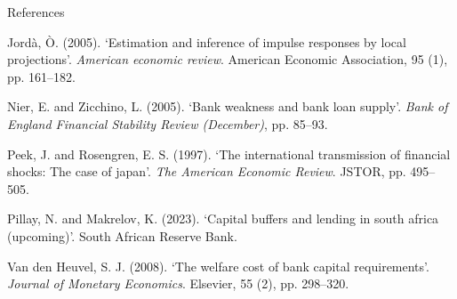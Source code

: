 \documentclass[
  14,
  ignorenonframetext,
  aspectratio=141,
]{beamer}
\newlength{\cslhangindent}
\newlength{\cslentryspacingunit} %
\newenvironment{CSLReferences}[2] %
 {%
  \setlength{\parindent}{0pt}
  \ifodd #1
  \let\oldpar\par
  \def\par{\hangindent=\cslhangindent\oldpar}
  \fi
  \setlength{\parskip}{#2\cslentryspacingunit}
 }%
 {}
\begin{document}
\begin{frame}[allowframebreaks]{References}
\begin{CSLReferences}{0}{0}
\leavevmode{}%
Jordà, Ò. (2005). {`Estimation and inference of impulse responses by
local projections'}. \emph{American economic review}. American Economic
Association, 95 (1), pp. 161--182.

\leavevmode{}%
Nier, E. and Zicchino, L. (2005). {`Bank weakness and bank loan
supply'}. \emph{Bank of England Financial Stability Review (December)},
pp. 85--93.

\leavevmode{}%
Peek, J. and Rosengren, E. S. (1997). {`The international transmission
of financial shocks: The case of japan'}. \emph{The American Economic
Review}. JSTOR, pp. 495--505.

\leavevmode{}%
Pillay, N. and Makrelov, K. (2023). {`Capital buffers and lending in
south africa (upcoming)'}. South African Reserve Bank.

\leavevmode{}%
Van den Heuvel, S. J. (2008). {`The welfare cost of bank capital
requirements'}. \emph{Journal of Monetary Economics}. Elsevier, 55 (2),
pp. 298--320.

\end{CSLReferences}
\end{frame}
\end{document}
